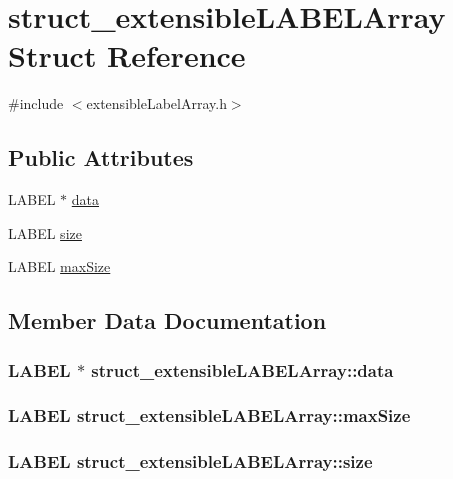 \hypertarget{structstruct__extensibleLABELArray}{
\section{struct\_\-extensibleLABELArray Struct Reference}
\label{structstruct__extensibleLABELArray}
}


{\ttfamily \#include $<$extensibleLabelArray.h$>$}\subsection*{Public Attributes}
\begin{DoxyCompactItemize}
\item 
LABEL $\ast$ \hyperlink{structstruct__extensibleLABELArray_a2681b822f4e0afe2e5eac8b20d38e7bd}{data}
\item 
LABEL \hyperlink{structstruct__extensibleLABELArray_a3f99d1f3aa8fd8d748a9e26c7fc2ce19}{size}
\item 
LABEL \hyperlink{structstruct__extensibleLABELArray_aab52858a3e75f71c5ccca585f77cd322}{maxSize}
\end{DoxyCompactItemize}


\subsection{Member Data Documentation}
\hypertarget{structstruct__extensibleLABELArray_a2681b822f4e0afe2e5eac8b20d38e7bd}{
\subsubsection[{data}]{\setlength{\rightskip}{0pt plus 5cm}LABEL $\ast$ {\bf struct\_\-extensibleLABELArray::data}}}
\label{structstruct__extensibleLABELArray_a2681b822f4e0afe2e5eac8b20d38e7bd}
\hypertarget{structstruct__extensibleLABELArray_aab52858a3e75f71c5ccca585f77cd322}{
\subsubsection[{maxSize}]{\setlength{\rightskip}{0pt plus 5cm}LABEL {\bf struct\_\-extensibleLABELArray::maxSize}}}
\label{structstruct__extensibleLABELArray_aab52858a3e75f71c5ccca585f77cd322}
\hypertarget{structstruct__extensibleLABELArray_a3f99d1f3aa8fd8d748a9e26c7fc2ce19}{
\subsubsection[{size}]{\setlength{\rightskip}{0pt plus 5cm}LABEL {\bf struct\_\-extensibleLABELArray::size}}}
\label{structstruct__extensibleLABELArray_a3f99d1f3aa8fd8d748a9e26c7fc2ce19}


